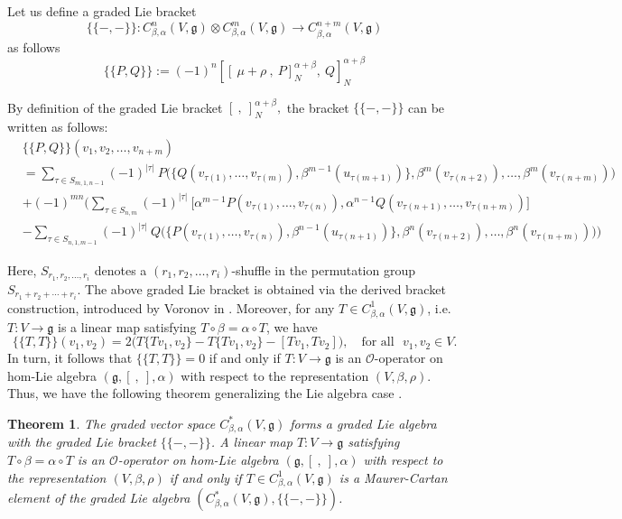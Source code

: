 \documentclass[a4paper,11pt]{amsart}
\theoremstyle{plain}
\newtheorem{theorem}{Theorem}[section]
\theoremstyle{definition}
\theoremstyle{remark}
\numberwithin{equation}{section}
\begin{document}
Let us define a graded Lie bracket 
$$\{\!\!\{ -,- \}\!\!\}:C^n_{\beta,\alpha}(V,\mathfrak{g})\otimes C^m_{\beta,\alpha}(V,\mathfrak{g}) \rightarrow C^{n+m}_{\beta,\alpha}(V,\mathfrak{g})$$
as follows
\begin{equation}\label{definition of bracket}
\{\!\!\{P,Q\}\!\!\}:=(-1)^n[[~\mu+\rho~,~ P]_N^{\alpha+\beta},~Q]_N^{\alpha+\beta}
\end{equation}

By definition of the graded Lie bracket $[~,~]_N^{\alpha+\beta},$ the bracket $\{\!\!\{-,-\}\!\!\}$ can be written as follows:
\begin{align}\label{derived bracket}
\nonumber
&\{\!\!\{P,Q\}\!\!\}(v_1,v_2,\ldots,v_{n+m})\\\nonumber
&=\sum_{\tau\in S_{m,1,n-1}}(-1)^{|\tau|}~ P\Big(\{Q(v_{\tau(1)},\ldots,v_{\tau(m)}),\beta^{m-1}(u_{\tau(m+1)})\},\beta^{m}(v_{\tau(n+2)}),\ldots,\beta^{m}(v_{\tau(n+m)})\Big)\\\nonumber
&+(-1)^{mn}\Bigg(\sum_{\tau\in S_{n,m}}(-1)^{|\tau|}~\big[\alpha^{m-1}P(v_{\tau(1)},\ldots,v_{\tau(n)}),\alpha^{n-1}Q(v_{\tau(n+1)},\ldots,v_{\tau(n+m)})\big]\\
&-\sum_{\tau\in S_{n,1,m-1}}(-1)^{|\tau|}~ Q\Big(\{P(v_{\tau(1)},\ldots,v_{\tau(n)}),\beta^{n-1}(u_{\tau(n+1)})\},\beta^{n}(v_{\tau(n+2)}),\ldots,\beta^{n}(v_{\tau(n+m)})\Big)\Bigg)
\end{align}

Here, $S_{r_1,r_2,\ldots,r_i}$ denotes a $(r_1,r_2,\ldots,r_i)$-shuffle in the permutation group $S_{r_1+r_2+\cdots+r_i}$. The above graded Lie bracket is obtained via the derived bracket construction, introduced by Voronov in \cite{Voronov}. Moreover, for any $T\in C^1_{\beta,\alpha}(V,\mathfrak{g})$, i.e. $T:V\rightarrow \mathfrak{g}$ is a linear map satisfying $T\circ \beta=\alpha\circ T$, we have $$\{\!\!\{T,T\}\!\!\}(v_1,v_2)=2\Big(T\{Tv_1,v_2\}-T\{Tv_1,v_2\}-[Tv_1,Tv_2]\Big),\quad \mbox{for all~~} v_1, v_2\in V.$$ 
In turn, it follows that $\{\!\!\{T,T\}\!\!\}=0$ if and only if $T:V\rightarrow \mathfrak{g}$ is an $\mathcal{O}$-operator on hom-Lie algebra $(\mathfrak{g},[~,~],\alpha)$ with respect to the representation $(V,\beta,\rho)$. 
Thus, we have the following theorem generalizing the Lie algebra case \cite{Sheng3}.

\begin{theorem}\label{Maurer Cartan element}
The graded vector space $C^*_{\beta,\alpha}(V,\mathfrak{g})$ forms a graded Lie algebra with the graded Lie bracket $\{\!\!\{-,-\}\!\!\}$. A linear map $T:V\rightarrow \mathfrak{g}$ satisfying $T\circ \beta=\alpha\circ T$ is an $\mathcal{O}$-operator on hom-Lie algebra $(\mathfrak{g},[~,~],\alpha)$ with respect to the representation $(V,\beta,\rho)$ if and only if $T\in C^1_{\beta,\alpha}(V,\mathfrak{g})$ is a Maurer-Cartan element of the graded Lie algebra $(C^*_{\beta,\alpha}(V,\mathfrak{g}),\{\!\!\{-,-\}\!\!\})$.
\end{theorem}
\end{document}
